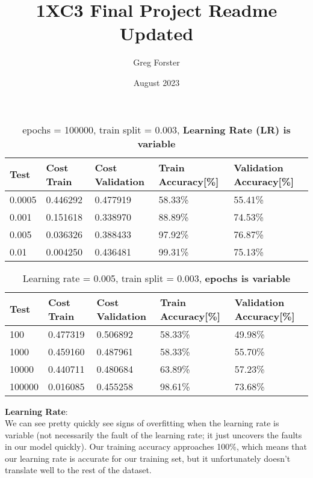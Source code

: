 \documentclass{report}
\title{1XC3 Final Project Readme Updated}
\author{Greg Forster}
\date{August 2023}
\begin{document}
\maketitle

\begin{table}[h!]
\centering
\caption{epochs = 100000, train split = 0.003, \textbf{Learning Rate (LR) is variable}}
\vspace{10pt}  %
\small
\begin{tabularx}{\textwidth}{@{} X X X X X @{}}
\hline
{Test} & {Cost Train} & {Cost Validation} & {Train Accuracy[\%]} & {Validation Accuracy[\%]} \\
\hline
0.0005 & 0.446292 & 0.477919 & 58.33\% & 55.41\% \\
\hline
0.001 & 0.151618 & 0.338970 & 88.89\% & 74.53\% \\
\hline
0.005 & 0.036326 & 0.388433 & 97.92\% & 76.87\% \\
\hline
0.01 & 0.004250 & 0.436481 & 99.31\% & 75.13\% \\
\hline
\end{tabularx}
\normalsize
\end{table}

\begin{table}[h!]
\centering
\caption{Learning rate = 0.005, train split = 0.003, \textbf{epochs is variable}}
\vspace{10pt}  %
\begin{tabularx}{\textwidth}{@{} X X X X X @{}}
\hline
{Test} & {Cost Train} & {Cost Validation} & {Train Accuracy[\%]} & {Validation Accuracy[\%]} \\
\hline
100 & 0.477319 & 0.506892 & 58.33\% & 49.98\% \\
\hline
1000 & 0.459160 & 0.487961 & 58.33\% & 55.70\% \\
\hline
10000 & 0.440711 & 0.480684 & 63.89\% & 57.23\% \\
\hline
100000 & 0.016085 & 0.455258 & 98.61\% & 73.68\% \\
\hline
\end{tabularx}
\end{table}

\textbf{Learning Rate}: \\

We can see pretty quickly see signs of overfitting when the learning rate is variable (not necessarily the fault of the learning rate; it just uncovers the faults in our model quickly). Our training accuracy approaches 100\%, which means that our learning rate is accurate for our training set, but it unfortunately doesn't translate well to the rest of the dataset.\\
\end{document}

